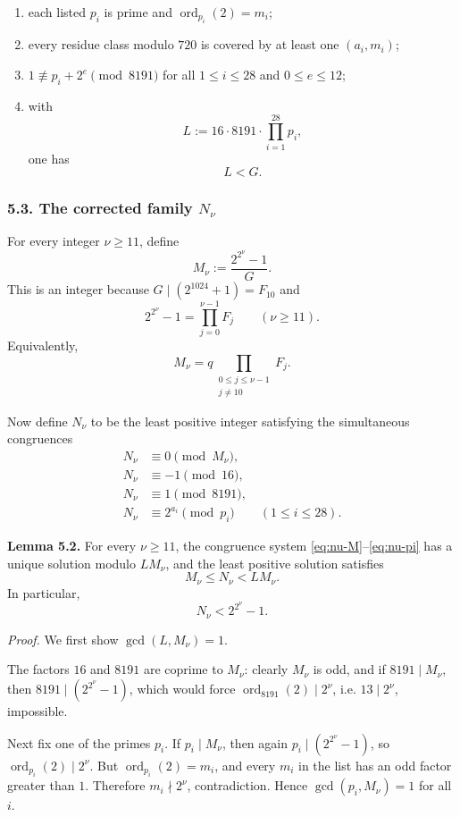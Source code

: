 \begin{enumerate}
\item each listed $p_i$ is prime and $\operatorname{ord}_{p_i}(2)=m_i$;
\item every residue class modulo $720$ is covered by at least one $(a_i,m_i)$;
\item $1\not\equiv p_i+2^e\pmod{8191}$ for all $1\le i\le 28$ and $0\le e\le 12$;
\item with
\[
L:=16\cdot 8191\cdot\prod_{i=1}^{28}p_i,
\]
one has
\[
L<G.
\]
\end{enumerate}

\subsubsection*{5.3. The corrected family $N_\nu$}

For every integer $\nu\ge 11$, define
\[
M_\nu:=\frac{2^{2^\nu}-1}{G}.
\]
This is an integer because $G\mid (2^{1024}+1)=F_{10}$ and
\[
2^{2^\nu}-1=\prod_{j=0}^{\nu-1}F_j\qquad (\nu\ge 11).
\]
Equivalently,
\[
M_\nu=q\prod_{\substack{0\le j\le \nu-1\\ j\neq 10}}F_j.
\]

Now define $N_\nu$ to be the least positive integer satisfying the simultaneous congruences
\begin{align}
N_\nu&\equiv 0\pmod{M_\nu},\label{eq:nu-M}\\
N_\nu&\equiv -1\pmod{16},\label{eq:nu-16}\\
N_\nu&\equiv 1\pmod{8191},\label{eq:nu-8191}\\
N_\nu&\equiv 2^{a_i}\pmod{p_i}\qquad (1\le i\le 28).\label{eq:nu-pi}
\end{align}

\medskip
\noindent\textbf{Lemma 5.2.}
For every $\nu\ge 11$, the congruence system \eqref{eq:nu-M}--\eqref{eq:nu-pi} has a unique solution modulo $LM_\nu$, and the least positive solution satisfies
\[
M_\nu\le N_\nu<LM_\nu.
\]
In particular,
\[
N_\nu<2^{2^\nu}-1.
\]

\medskip
\noindent\emph{Proof.}
We first show $\gcd(L,M_\nu)=1$.

The factors $16$ and $8191$ are coprime to $M_\nu$: clearly $M_\nu$ is odd, and if $8191\mid M_\nu$, then $8191\mid (2^{2^\nu}-1)$, which would force $\operatorname{ord}_{8191}(2)\mid 2^\nu$, i.e. $13\mid 2^\nu$, impossible.

Next fix one of the primes $p_i$.  If $p_i\mid M_\nu$, then again $p_i\mid (2^{2^\nu}-1)$, so $\operatorname{ord}_{p_i}(2)\mid 2^\nu$. But $\operatorname{ord}_{p_i}(2)=m_i$, and every $m_i$ in the list has an odd factor greater than $1$. Therefore $m_i\nmid 2^\nu$, contradiction. Hence $\gcd(p_i,M_\nu)=1$ for all $i$.

